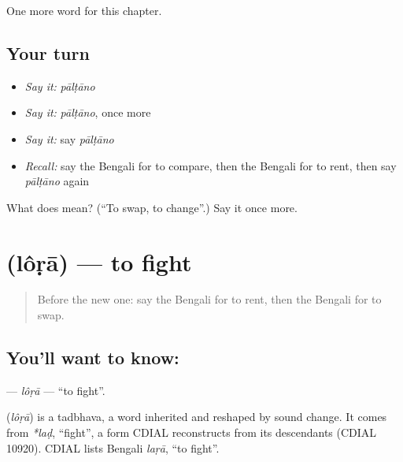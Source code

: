 \begin{grammarlens}[title={What you've built}]
One more word for this chapter.
\end{grammarlens}

\subsection*{Your turn}
\begin{itemize}
\raggedright
  \item \emph{Say it:} \emph{pālṭāno}
  \item \emph{Say it:} \emph{pālṭāno}, once more
  \item \emph{Say it:} say \emph{pālṭāno}
  \item \emph{Recall:} say the Bengali for to compare, then the Bengali for to rent, then say \emph{pālṭāno} again
\end{itemize}

\begin{tcolorbox}[breakable,colback=teal!4,colframe=teal!35!black,title={Before you move on}]
What does  mean? (\textquotedblleft{}To swap, to change\textquotedblright{}.) Say it once more.
\end{tcolorbox}
\section[\texorpdfstring{\bn{লড়া} (lôṛā)}{লড়া (lôṛā)}]{ (lôṛā) — to fight}

\label{lesson:BN-C212-lora}



\begin{quote}
Before the new one: say the Bengali for to rent, then the Bengali for to swap.
\end{quote}

\subsection*{You'll want to know: }
\textbf{} — \emph{lôṛā} — \textquotedblleft{}to fight\textquotedblright{}.

\begin{cousinweb}
\textbf{} (\emph{lôṛā}) is a tadbhava, a word inherited and reshaped by sound change. It comes from \emph{*laḍ}, \textquotedblleft{}fight\textquotedblright{}, a form CDIAL reconstructs from its descendants (CDIAL 10920). CDIAL lists Bengali \emph{laṛā}, \textquotedblleft{}to fight\textquotedblright{}.
\end{cousinweb}

